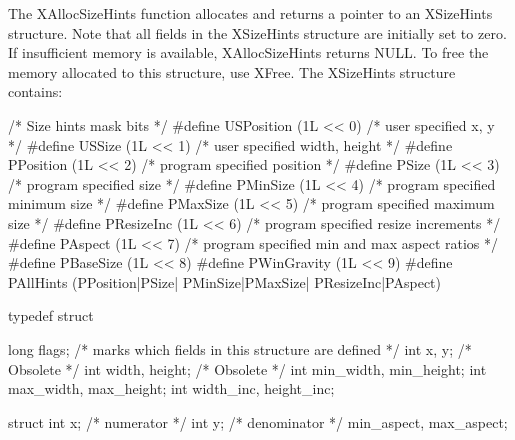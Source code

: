 \documentclass{report}
\begin{document}
\begin{itemize}
\begin{itemize}
            \bigbreak \noindent 
            The XAllocSizeHints function allocates and returns a pointer to an XSizeHints structure. Note that all fields in the XSizeHints structure are initially set to zero. If insufficient memory is available, XAllocSizeHints returns NULL. To free the memory allocated to this structure, use XFree.
            \bigbreak \noindent 
            The XSizeHints structure contains:
            \bigbreak \noindent 
            \begin{cppcode}
                /* Size hints mask bits */
                #define USPosition      (1L << 0)       /* user specified x, y */
                #define USSize          (1L << 1)       /* user specified width, height */
                #define PPosition       (1L << 2)       /* program specified position */
                #define PSize           (1L << 3)       /* program specified size */
                #define PMinSize        (1L << 4)       /* program specified minimum size */
                #define PMaxSize        (1L << 5)       /* program specified maximum size */
                #define PResizeInc      (1L << 6)       /* program specified resize increments */
                #define PAspect         (1L << 7)       /* program specified min and max aspect ratios */
                #define PBaseSize       (1L << 8)
                #define PWinGravity     (1L << 9)
                #define PAllHints   (PPosition|PSize| PMinSize|PMaxSize| PResizeInc|PAspect)
            \end{cppcode}
            \bigbreak \noindent 
            \begin{cppcode}
                typedef struct {
                    long flags;                     /* marks which fields in this structure are defined */
                    int x, y;                       /* Obsolete */
                    int width, height;              /* Obsolete */
                    int min_width, min_height;
                    int max_width, max_height;
                    int width_inc, height_inc;

                    struct {
                        int x;                      /* numerator */
                        int y;                      /* denominator */
                    } min_aspect, max_aspect;

}
\end{cppcode}
\end{itemize}
\end{itemize}
\end{document}
